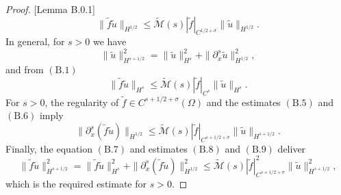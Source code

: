 \begin{proof}{[Lemma B.0.1]}
$$ \|\tilde{f}\tilde{u}\|_{H^{1/2}} \leq  \tilde{\mathcal{M}}(s)|\tilde{f}|_{C^{1/2+\sigma}}\|\tilde{u}\|_{H^{1/2}}.$$
In general, for $s>0$ we have
\begin{equation}
\|\tilde{u}\|_{H^{s+1/2}}^2 = \|\tilde{u}\|_{H^s}^2 + \|\partial_x^s \tilde{u}\|_{H^{1/2}}^2,
\end{equation}
and from $(\text{B}.1)$
\begin{equation}
\|\tilde{f}\tilde{u}\|_{H^s} \le \tilde{\mathcal{M}}(s)|\tilde{f}|_{C^s}\|\tilde{u}\|_{H^s}.
\end{equation}
For $s>0$, the regularity of $\tilde{f}\in C^{s+1/2+\sigma}(\Omega)$ and the estimates $(\text{B}.5)$ and $(\text{B}.6)$ imply
\begin{equation}
\|\partial_x^s (\tilde{f}\tilde{u})\|_{H^{1/2}} \le 
\tilde{\mathcal{M}}(s)|\tilde{f}|_{C^{s+1/2+\sigma}}\|\tilde{u}\|_{H^{s+1/2}}.
\end{equation}
Finally, the equation $(\text{B}.7)$ and estimates $(\text{B}.8)$ and $(\text{B}.9)$ deliver 
$$
\|\tilde{f}\tilde{u}\|_{H^{s+1/2}}^2 = \|\tilde{f}\tilde{u}\|_{H^s}^2 + \|\partial_x^s (\tilde{f}\tilde{u})\|_{H^{1/2}}^2\leq \tilde{\mathcal{M}}(s)|\tilde{f}|_{C^{s+1/2+\sigma}}^2\|\tilde{u}\|_{H^{s+1/2}}^2,$$
which is the required estimate for $s>0$. 
\end{proof}



